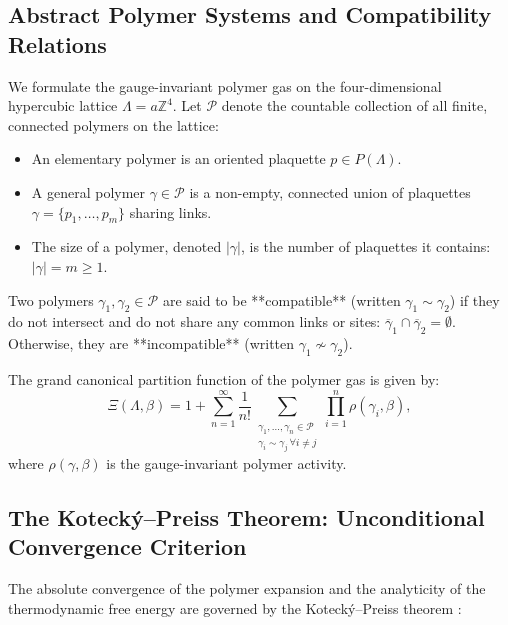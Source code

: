 \subsection{Abstract Polymer Systems and Compatibility Relations}
\label{subsec:abstract_polymer_systems}

We formulate the gauge-invariant polymer gas on the four-dimensional hypercubic lattice $\Lambda = a \mathbb{Z}^4$.
Let $\mathcal{P}$ denote the countable collection of all finite, connected polymers on the lattice:
\begin{itemize}
    \item An elementary polymer is an oriented plaquette $p \in P(\Lambda)$.
    \item A general polymer $\gamma \in \mathcal{P}$ is a non-empty, connected union of plaquettes $\gamma = \{p_1, \dots, p_m\}$ sharing links.
    \item The size of a polymer, denoted $|\gamma|$, is the number of plaquettes it contains: $|\gamma| = m \ge 1$.
\end{itemize}

Two polymers $\gamma_1, \gamma_2 \in \mathcal{P}$ are said to be **compatible** (written $\gamma_1 \sim \gamma_2$) if they do not intersect and do not share any common links or sites: $\overline{\gamma}_1 \cap \overline{\gamma}_2 = \emptyset$. Otherwise, they are **incompatible** (written $\gamma_1 \nsim \gamma_2$).

The grand canonical partition function of the polymer gas is given by:
\begin{equation}
\label{eq:ch13_polymer_partition_function}
\Xi(\Lambda, \beta) = 1 + \sum_{n=1}^\infty \frac{1}{n!} \sum_{\substack{\gamma_1, \dots, \gamma_n \in \mathcal{P} \\ \gamma_i \sim \gamma_j \, \forall i \ne j}} \prod_{i=1}^n \rho(\gamma_i, \beta),
\end{equation}
where $\rho(\gamma, \beta)$ is the gauge-invariant polymer activity.

\subsection{The Koteck\'y--Preiss Theorem: Unconditional Convergence Criterion}
\label{subsec:kotecky_preiss_theorem}

The absolute convergence of the polymer expansion and the analyticity of the thermodynamic free energy are governed by the Koteck\'y--Preiss theorem \cite{KoteckyPreiss1986}:

